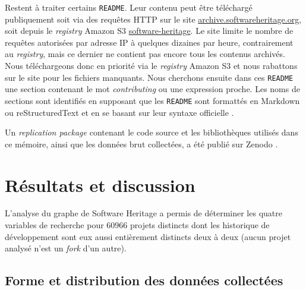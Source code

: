 \documentclass[dvipsnames,runningheads]{llncs}
\newcommand{\en}[1]{\foreignlanguage{english}{\emph{#1}}}
\begin{document}
    \label{sec:collectreadme}
    Restent à traiter certains \texttt{README}. Leur contenu peut être téléchargé publiquement soit via des
    requêtes HTTP sur le site \href{https://archive.softwareheritage.org/}{archive.softwareheritage.org}, soit
    depuis le \en{registry} Amazon S3
    \href{https://registry.opendata.aws/software-heritage}{software-heritage}. Le site limite le nombre de
    requêtes autorisées par adresse IP à quelques dizaines par heure, contrairement au \en{registry}, mais ce
    dernier ne contient pas encore tous les contenus archivés. Nous téléchargeons donc en priorité via le
    \en{registry} Amazon S3 et nous rabattons sur le site pour les fichiers manquants. Nous cherchons ensuite
    dans ces \texttt{README} une section contenant le mot \en{contributing} ou une expression proche. Les noms
    de sections sont identifiés en supposant que les \texttt{README} sont formattés en Markdown ou
    reStructuredText et en se basant sur leur syntaxe officielle \parencite{markdown-headings,rst-sections}.

    Un \en{replication package} contenant le code source et les bibliothèques utilisés dans ce mémoire, ainsi
    que les données brut collectées, a été publié sur Zenodo
    \parencite[anonymisé]{anonymous-replication-package}.

    \section{Résultats et discussion}

    \captionsetup[figure]{format=plain,singlelinecheck=true,justification=centering}
    \captionsetup[subfigure]{format=plain,singlelinecheck=true,justification=centering}
    \captionsetup[table]{format=plain,singlelinecheck=true,justification=centering,position=above}

    L'analyse du graphe de Software Heritage a permis de déterminer les quatre variables de recherche pour
    $60 966$ projets distincts dont les historique de développement sont eux aussi entièrement distincts deux
    à deux (aucun projet analysé n'est un \en{fork} d'un autre).

    \subsection{Forme et distribution des données collectées}
\end{document}
